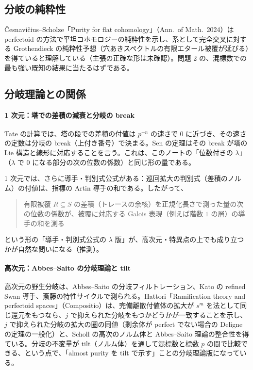 \documentclass[11pt,a4paper]{ltjsarticle}
\theoremstyle{plain}
\theoremstyle{definition}
\theoremstyle{remark}
\theoremstyle{plain}
\begin{document}
\subsection{分岐の純粋性}
Česnavičius--Scholze「Purity for flat cohomology」（Ann.\ of Math.\ 2024）は perfectoid の方法で平坦コホモロジーの純粋性を示し、系として完全交叉に対する Grothendieck の純粋性予想（穴あきスペクトルの有限エタール被覆が延びる）を得ていると理解している（主張の正確な形は未確認）。問題 2 の、混標数での最も強い既知の結果に当たるはずである。

\subsection{分岐理論との関係}

\paragraph{1 次元：塔での差積の減衰と分岐の break}
Tate の計算では、塔の段での差積の付値は $p^{-n}$ の速さで $0$ に近づき、その速さの定数は分岐の break（上付き番号）で決まる。Sen の定理はその break が塔の Lie 構造と線形に対応することを言う。これは、このノートの「位数付きの $\lambda$」（$\lambda$ で $0$ になる部分の次の位数の係数）と同じ形の量である。

1 次元では、さらに導手・判別式公式がある：巡回拡大の判別式（差積のノルム）の付値は、指標の Artin 導手の和である。したがって、
\begin{quote}
有限被覆 $R\subseteq S$ の差積（トレースの余核）を正規化長さで測った量の次の位数の係数が、被覆に対応する Galois 表現（例えば階数 $1$ の層）の導手の和を測る
\end{quote}
という形の「導手・判別式公式の $\lambda$ 版」が、高次元・特異点の上でも成り立つかが自然な問いになる（推測）。

\paragraph{高次元：Abbes--Saito の分岐理論と tilt}
高次元の野生分岐は、Abbes--Saito の分岐フィルトレーション、Kato の refined Swan 導手、斎藤の特性サイクルで測られる。Hattori「Ramification theory and perfectoid spaces」（Compositio）は、完備離散付値体の拡大が $s^m$ を法として同じ還元をもつなら、$j$ で抑えられた分岐をもつかどうかが一致することを示し、$j$ で抑えられた分岐の拡大の圏の同値（剰余体が perfect でない場合の Deligne の定理の一般化）と、Scholl の高次のノルム体と Abbes--Saito 理論の整合性を得ている。分岐の不変量が tilt（ノルム体）を通して混標数と標数 $p$ の間で比較できる、という点で、「almost purity を tilt で示す」ことの分岐理論版になっている。
\end{document}
